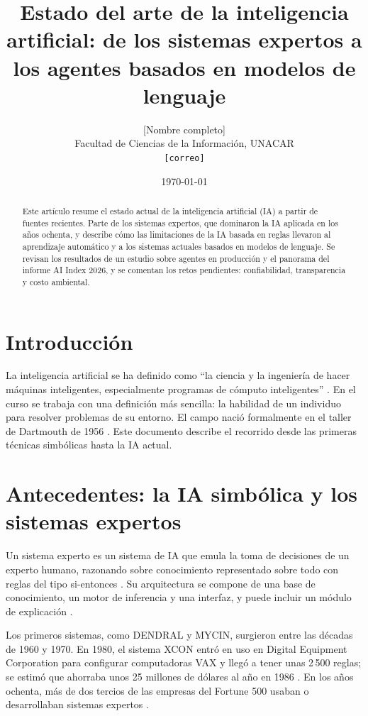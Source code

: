\documentclass[11pt,a4paper]{article}
\title{Estado del arte de la inteligencia artificial: de los sistemas expertos a los agentes basados en modelos de lenguaje}
\author{[Nombre completo] \\ Facultad de Ciencias de la Informaci\'on, UNACAR \\ \texttt{[correo]}}
\date{\today}
\begin{document}
\maketitle

\begin{abstract}
Este art\'iculo resume el estado actual de la inteligencia artificial (IA) a partir de fuentes recientes. Parte de los sistemas expertos, que dominaron la IA aplicada en los a\~nos ochenta, y describe c\'omo las limitaciones de la IA basada en reglas llevaron al aprendizaje autom\'atico y a los sistemas actuales basados en modelos de lenguaje. Se revisan los resultados de un estudio sobre agentes en producci\'on y el panorama del informe AI Index 2026, y se comentan los retos pendientes: confiabilidad, transparencia y costo ambiental.
\end{abstract}

\section{Introducci\'on}
La inteligencia artificial se ha definido como ``la ciencia y la ingenier\'ia de hacer m\'aquinas inteligentes, especialmente programas de c\'omputo inteligentes'' \cite{mccarthy2007}. En el curso se trabaja con una definici\'on m\'as sencilla: la habilidad de un individuo para resolver problemas de su entorno. El campo naci\'o formalmente en el taller de Dartmouth de 1956 \cite{ibm}. Este documento describe el recorrido desde las primeras t\'ecnicas simb\'olicas hasta la IA actual.

\section{Antecedentes: la IA simb\'olica y los sistemas expertos}
Un sistema experto es un sistema de IA que emula la toma de decisiones de un experto humano, razonando sobre conocimiento representado sobre todo con reglas del tipo si-entonces \cite{wikiES}. Su arquitectura se compone de una base de conocimiento, un motor de inferencia y una interfaz, y puede incluir un m\'odulo de explicaci\'on \cite{wikiES}.

Los primeros sistemas, como DENDRAL y MYCIN, surgieron entre las d\'ecadas de 1960 y 1970. En 1980, el sistema XCON entr\'o en uso en Digital Equipment Corporation para configurar computadoras VAX y lleg\'o a tener unas 2\,500 reglas; se estim\'o que ahorraba unos 25 millones de d\'olares al a\~no en 1986 \cite{xcon}. En los a\~nos ochenta, m\'as de dos tercios de las empresas del Fortune 500 usaban o desarrollaban sistemas expertos \cite{history}.
\end{document}
